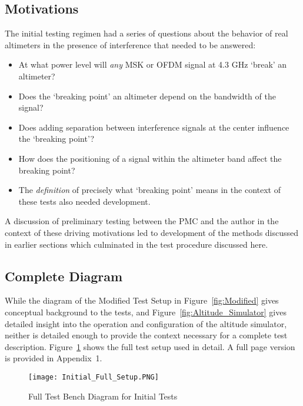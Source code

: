 \subsection{Motivations}
The initial testing regimen had a series of questions about the behavior of real altimeters in the presence of interference that needed to be answered: 

\begin{itemize}
\item At what power level will \textit{any} MSK or OFDM signal at 4.3 GHz `break' an altimeter?
\item Does the `breaking point' an altimeter depend on the bandwidth of the signal?
\item Does adding separation between interference signals at the center influence the `breaking point'? 
\item How does the positioning of a signal within the altimeter band affect the breaking point?
\item The \textit{definition} of precisely what `breaking point' means in the context of these tests also needed development.  
\end{itemize}

A discussion of preliminary testing between the PMC and the author in the context of these driving motivations led to development of the methods discussed in earlier sections which culminated in the test procedure discussed here.  

\subsection{Complete Diagram}
While the diagram of the Modified Test Setup in Figure~\ref{fig:Modified} gives conceptual background to the tests, and Figure~\ref{fig:Altitude_Simulator} gives detailed insight into the operation and configuration of the altitude simulator, neither is detailed enough to provide the context necessary for a complete test description. Figure~\ref{fig:Initial} shows the full test setup used in detail. A full page version is provided in Appendix~1. 



\begin{figure}[ht]
\centering
\texttt{[image: Initial\_Full\_Setup.PNG]}
\caption{Full Test Bench Diagram for Initial Tests}

\label{fig:Initial}
\end{figure}

